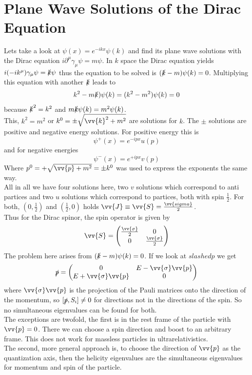 \documentclass{include/thesisclass}
\newcommand{\vp}{\vv{p}}
\newcommand{\p}{\partial}
\newcommand{\Matz}[4]{\begin{pmatrix}#1&#2\\#3&#4\end{pmatrix}}
\begin{document}
\section{Plane Wave Solutions of the Dirac Equation}

Lets take a look at $\psi(x) = e^{-ikx}\psi(k)$ and find its plane wave solutions with the Dirac equation $i \p^\mu \gamma_\mu \psi = m \psi$. In $k$ space the Dirac equation yields $i (-i k^\mu) \gamma_\mu \psi = \slashed{k} \psi$ thus the equation to be solved is $(\slashed{k} - m) \psi(k) = 0$. Multiplying this equation with another $\slashed{k}$ leads to
\[ k^2 - m \slashed{k}) \psi(k) = (k^2 - m ^2) \psi(k)= 0 \]
because $\slashed{k}^2 = k^2$ and $m\slashed{k}\psi(k) = m^2 \psi(k)$.\\
This, $k^2 = m^2$ or $k^0 = \pm \sqrt{ \vv{k}^2 + m ^2}$ are solutions for $k$. The $\pm$ solutions are positive and negative energy solutions. For positive energy this is
\[\psi^+(x) = e^{-ipx}u(p)\]
and for negative energies
\[ \psi^-(x) = e^{+ipx}v(p)\]
Where $p^0 = + \sqrt{\vv{p} + m^2} = \pm k^0$ was used to express the exponents the same way.\\
All in all we have four solutions here, two $v$ solutions which correspond to anti partices and two $u$ solutions which correspond to partices, both with spin $\frac{1}{2}$. For both, $\left( 0, \frac{1}{2}\right)$ and $\left(\frac{1}{2}, 0\right)$ holds $\vv{J} \equiv \vv{S} = \frac{\vv{sigma}}{2}$.\\
Thus for the Dirac spinor, the spin operator is given by
\[ \vv{S} = \Matz{\frac{\vv{\sigma}}{2}}{0}{0}{\frac{\vv{\sigma}}{2}}\]
The problem here arises from $(\slashed{k} - m)\psi(k) = 0$. If we look at $slashed{p}$ we get
\[ \slashed{p} = \Matz{0}{E - \vv{\sigma}\vv{p}}{E + \vv{\sigma}\vv{p}}{0}\]
where $\vv{\sigma}\vp$ is the projection of the Pauli matrices onto the direction of the momentum, so $[\slashed{p}, S_i]\neq 0$ for directions not in the directions of the spin. So no simultaneous eigenvalues can be found for both.\\
The exceptions are twofold, the first is in the rest frame of the particle with $\vp = 0$. There we can choose a spin direction and boost to an arbitrary frame. This does not work for massless particles in ultrarelativistics.\\
The second, more general approach is, to choose the direction of $\vp$ as the quantization axis, then the helicity eigenvalues are the simultaneous eigenvalues for momentum and spin of the particle.\\
\end{document}

